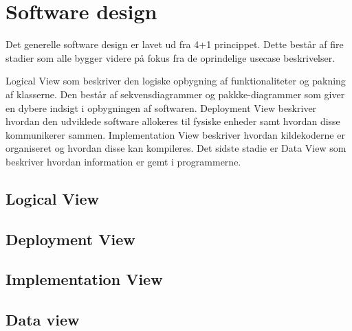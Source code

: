 \chapter{Software design}
Det generelle software design er lavet ud fra 4+1 princippet. Dette består af fire stadier som alle bygger videre på fokus fra de oprindelige usecase beskrivelser.

Logical View som beskriver den logiske opbygning af funktionaliteter og pakning af klasserne. Den består af sekvensdiagrammer og pakkke-diagrammer som giver en dybere indsigt i opbygningen af softwaren.\newline
Deployment View beskriver hvordan den udviklede software allokeres til fysiske enheder samt hvordan disse kommunikerer sammen.\newline
Implementation View beskriver hvordan kildekoderne er organiseret og hvordan disse kan kompileres.\newline
Det sidste stadie er Data View som beskriver hvordan information er gemt i programmerne.

\section{Logical View}


\section{Deployment View}


\section{Implementation View}


\section{Data view}

